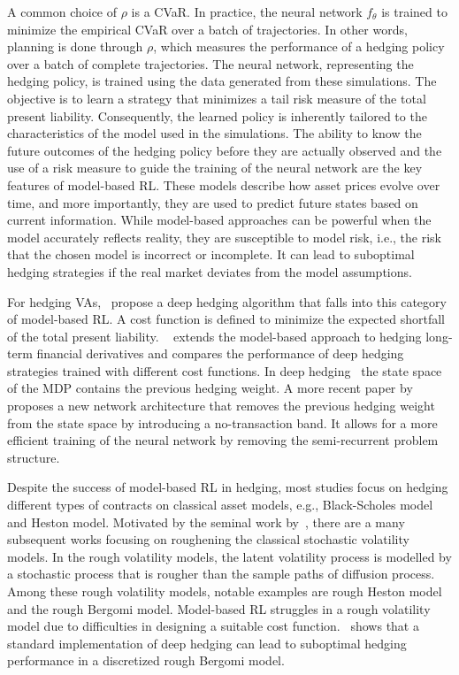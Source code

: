 A common choice of $\rho$ is a CVaR.
In practice, the neural network $f_{\theta}$ is trained to minimize the empirical CVaR over a batch of trajectories.
In other words, planning is done through $\rho$, which measures the performance of a hedging policy over a batch of complete trajectories.
The neural network, representing the hedging policy, is trained using the data generated from these simulations. 
The objective is to learn a strategy that minimizes a tail risk measure of the total present liability.
Consequently, the learned policy is inherently tailored to the characteristics of the model used in the simulations.
The ability to know the future outcomes of the hedging policy before they are actually observed and the use of a risk measure to guide the training of the neural network are the key features of model-based RL.
These models describe how asset prices evolve over time, and more importantly, they are used to predict future states based on current information.
While model-based approaches can be powerful when the model accurately reflects reality, they are susceptible to model risk, i.e., the risk that the chosen model is incorrect or incomplete. 
It can lead to suboptimal hedging strategies if the real market deviates from the model assumptions.

For hedging VAs,~\cite{xu2020variable} propose a deep hedging algorithm that falls into this category of model-based RL.
A cost function is defined to minimize the expected shortfall of the total present liability.
~\cite{carbonneau2021deep} extends the model-based approach to hedging long-term financial derivatives and compares the performance of deep hedging strategies trained with different cost functions.
In deep hedging~\citep{buehler2019deep} the state space of the MDP contains the previous hedging weight.
A more recent paper by~\cite{imaki2021no} proposes a new network architecture that removes the previous hedging weight from the state space by introducing a no-transaction band.
It allows for a more efficient training of the neural network by removing the semi-recurrent problem structure.

Despite the success of model-based RL in hedging, most studies focus on hedging different types of contracts on classical asset models, e.g., Black-Scholes model and Heston model.
Motivated by the seminal work by~\cite{gatheral2022volatility}, there are a many subsequent works focusing on roughening the classical stochastic volatility models. 
In the rough volatility models, the latent volatility process is modelled by a stochastic process that is rougher than the sample paths of diffusion process. 
Among these rough volatility models, notable examples are rough Heston model and the rough Bergomi model. 
Model-based RL struggles in a rough volatility model due to difficulties in designing a suitable cost function.~\cite{horvath2021deep} shows that a standard implementation of deep hedging can lead to suboptimal hedging performance in a discretized rough Bergomi model. 

